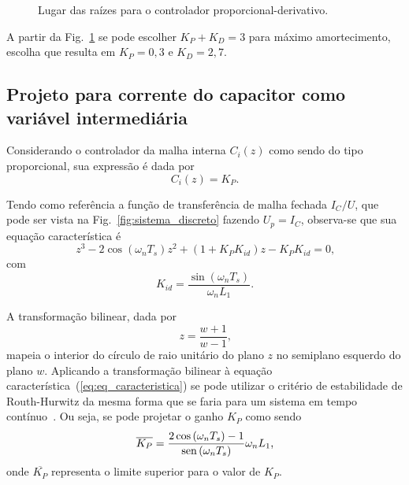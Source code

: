   \begin{figure}[htb]
    \renewcommand\figurename{Fig.}
    \caption{Lugar das raízes para o controlador proporcional-derivativo.}
    \label{fig:rlocus_vc_2}
  \end{figure}

  A partir da Fig.~\ref{fig:rlocus_vc_2} se pode escolher $K_P+K_D = 3$ para máximo amortecimento, escolha que resulta em $K_P = 0,3$ e $K_D = 2,7$.


\subsection{Projeto para corrente do capacitor como variável intermediária}

  Considerando o controlador da malha interna $C_i(z)$ como sendo do tipo proporcional, sua expressão é dada por
  \begin{equation}
    C_i(z) = K_P\text{.}
  \end{equation}

  Tendo como referência a função de transferência de malha fechada $I_C/U$, que pode ser vista na Fig.~\ref{fig:sistema_discreto} fazendo $U_p = I_C$, observa-se que sua equação característica é
  \begin{equation}
    z^3 - 2 \cos \left( \omega_n T_s \right) z^2 + \left( 1 + K_P K_{id} \right) z - K_P K_{id} = 0\text{,}
    \label{eq:eq_caracteristica}
  \end{equation}
  com
  \begin{equation}
    K_{id} = \frac{\sin(\omega_n T_s)}{\omega_n L_1}\text{.}
  \end{equation}

  A transformação bilinear, dada por
  \begin{equation}
    z = \frac{w + 1}{w - 1}\text{,}
  \end{equation}
  mapeia o interior do círculo de raio unitário do plano $z$ no semiplano esquerdo do plano $w$. Aplicando a transformação bilinear à equação característica~(\ref{eq:eq_caracteristica}) se pode utilizar o critério de estabilidade de Routh-Hurwitz da mesma forma que se faria para um sistema em tempo contínuo~\cite{ref:OGATA}. Ou seja, se pode projetar o ganho $K_P$ como sendo
  \begin{equation}
    \overline{K_P} = \frac{2 \cos \left( \omega_n T_s \right) - 1}
      {\operatorname{sen} \left( \omega_n T_s \right)} \omega_n L_1\text{,}
  \end{equation}
  onde $\overline{K_P}$ representa o limite superior para o valor de $K_P$.

